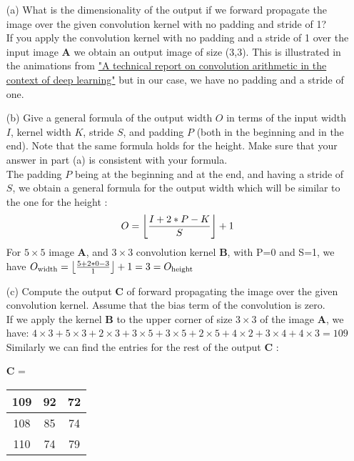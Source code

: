 \documentclass[11pt]{article}
\DeclarePairedDelimiter\floor{\lfloor}{\rfloor}
\newcommand{\0}{\mat{0}}
\newcommand{\matr}[1]{\bm{#1}}     %
\begin{document}
\begin{itemize}
    \item[(a)] What is the dimensionality of the output if we forward propagate the image over the given convolution kernel with no padding and stride of 1? \\
    
     \smallskip
    If you apply the convolution kernel with no padding and a stride of 1 over the input image  $\matr{A}$ we obtain an output image of size (3,3).
    This is illustrated in the animations  from \href{https://github.com/vdumoulin/conv_arithmetic} {"A technical report on convolution arithmetic in the context of deep learning"}
    but in our case, we have no padding and a stride of one.
    
    \item[(b)] Give a general formula of the output width $O$ in terms of the input width $I$, kernel width $K$, stride $S$, and padding $P$ (both in the beginning and in the end). Note that the same formula holds for the height. Make sure that your answer in part (a) is consistent with your formula. \\
    
    \smallskip
    The padding $P$ being at the beginning and at the end, and having a stride of $S$, we obtain a general formula for the output width which will be similar to the one for the height :
    \[
    	O  = \floor*{\frac{I + 2 * P - K}{S}} + 1 
    \]
    For   $5\times 5$ image $\matr{A}$, and $3\times 3$  convolution kernel $\matr{B}$, with P=0 and S=1, we have $O_{\text{width}} =  \floor*{\frac{5 + 2 * 0 - 3}{1}} + 1 = 3 = O_{\text{height}}$
    
    \item[(c)] Compute the output $\matr{C}$ of forward propagating the image over the
given convolution kernel. Assume that the bias term of the convolution is zero.\\

	\smallskip
	If we apply the kernel $\matr{B}$ to the upper corner of size   $3\times 3$ of the image $\matr{A}$, we have: 
	$4 \times 3 + 5 \times 3 + 2 \times 3 + 3 \times 5 +  3 \times 5 + 2 \times 5 + 4 \times 2 + 3 \times 4 + 4 \times 3 = 109$
	Similarly we can find the entries for the rest of the output $\matr{C}$ :

	    \begin{table}[!ht]
		    \centering
    		$\matr{C}$ = \begin{tabular}{|c|c|c|} 
    			\hline
			    109 & 92 & 72 \\ \hline 
		        108 & 85 & 74 \\ \hline
       			110 & 74 & 79 \\ \hline 
   		 \end{tabular}
    	  \end{table}


\end{itemize}
\end{document}

